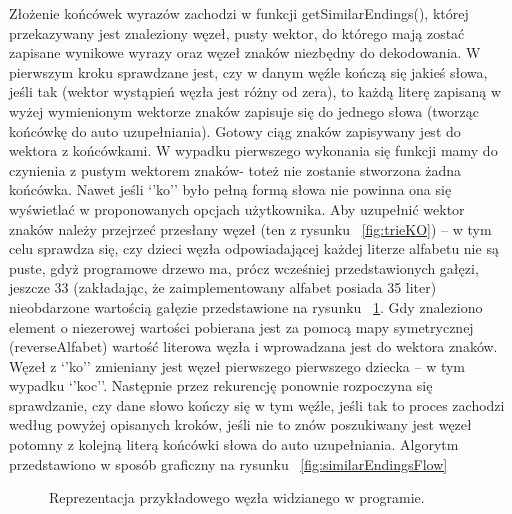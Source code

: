 \documentclass[twoside,a4paper]{book}
\begin{document}
Złożenie końcówek wyrazów zachodzi w funkcji getSimilarEndings(), której przekazywany jest znaleziony
 węzeł, pusty wektor, do którego mają zostać zapisane wynikowe wyrazy oraz węzeł znaków niezbędny do dekodowania. 
W pierwszym kroku sprawdzane jest, czy w danym węźle kończą się  jakieś słowa, jeśli tak (wektor wystąpień węzła jest różny od zera), to każdą literę zapisaną w wyżej wymienionym wektorze znaków zapisuje się do jednego słowa (tworząc końcówkę do auto uzupełniania). Gotowy ciąg znaków zapisywany jest do wektora z końcówkami. W wypadku pierwszego wykonania się funkcji mamy do czynienia z pustym wektorem znaków- toteż nie zostanie stworzona żadna końcówka. Nawet jeśli  ‘’ko’’ było pełną formą słowa nie powinna ona się wyświetlać w proponowanych opcjach użytkownika. Aby uzupełnić wektor znaków należy przejrzeć przesłany węzeł (ten z rysunku ~\ref{fig:trieKO}) – w tym celu sprawdza się, czy dzieci węzła odpowiadającej każdej literze alfabetu nie są puste, gdyż programowe drzewo ma, prócz wcześniej przedstawionych gałęzi, jeszcze 33 (zakładając, że zaimplementowany alfabet posiada 35 liter) nieobdarzone wartością gałęzie przedstawione na rysunku ~\ref{fig:trieKOnull}. Gdy znaleziono element o niezerowej wartości pobierana jest za pomocą mapy symetrycznej (reverseAlfabet) wartość literowa węzła i wprowadzana jest do wektora znaków. Węzeł z ‘’ko’’ zmieniany jest węzeł pierwszego pierwszego dziecka – w tym wypadku ‘’koc’’. Następnie przez rekurencję ponownie rozpoczyna się sprawdzanie, czy dane słowo kończy się w tym węźle, jeśli tak to proces zachodzi według powyżej opisanych kroków, jeśli nie to znów poszukiwany jest węzeł potomny z kolejną literą końcówki słowa do auto uzupełniania. Algorytm przedstawiono w sposób graficzny na rysunku ~\ref{fig:similarEndingsFlow}
		\begin{figure}[!h]
		\centering
		\caption{Reprezentacja przykładowego węzła widzianego w programie. }
		\label{fig:trieKOnull}
		\end{figure}
\end{document}
